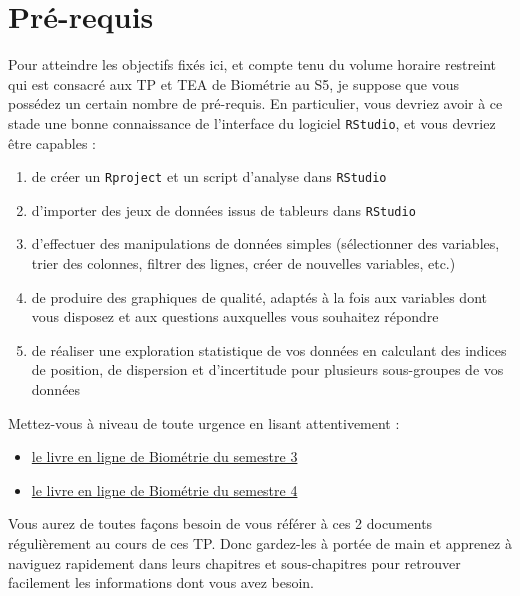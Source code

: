 \documentclass[
  french,
  a4paper,
  DIV=11,
  numbers=noendperiod,
  oneside]{scrreprt}
\providecommand{\tightlist}{%
  \setlength{\itemsep}{0pt}\setlength{\parskip}{0pt}}
\begin{document}
\section*{Pré-requis}\label{pruxe9-requis}


Pour atteindre les objectifs fixés ici, et compte tenu du volume horaire
restreint qui est consacré aux TP et TEA de Biométrie au S5, je suppose
que vous possédez un certain nombre de pré-requis. En particulier, vous
devriez avoir à ce stade une bonne connaissance de l'interface du
logiciel \texttt{RStudio}, et vous devriez être capables :

\begin{enumerate}
\def\labelenumi{\arabic{enumi}.}
\tightlist
\item
  de créer un \texttt{Rproject} et un script d'analyse dans
  \texttt{RStudio}
\item
  d'importer des jeux de données issus de tableurs dans \texttt{RStudio}
\item
  d'effectuer des manipulations de données simples (sélectionner des
  variables, trier des colonnes, filtrer des lignes, créer de nouvelles
  variables, etc.)
\item
  de produire des graphiques de qualité, adaptés à la fois aux variables
  dont vous disposez et aux questions auxquelles vous souhaitez répondre
\item
  de réaliser une exploration statistique de vos données en calculant
  des indices de position, de dispersion et d'incertitude pour plusieurs
  sous-groupes de vos données
\end{enumerate}

\begin{tcolorbox}[enhanced jigsaw, arc=.35mm, bottomrule=.15mm, bottomtitle=1mm, breakable, colback=white, colbacktitle=quarto-callout-warning-color!10!white, colframe=quarto-callout-warning-color-frame, coltitle=black, left=2mm, leftrule=.75mm, opacityback=0, opacitybacktitle=0.6, rightrule=.15mm, title=\textcolor{quarto-callout-warning-color}{\faExclamationTriangle}\hspace{0.5em}{Si ces pré-requis ne sont pas maîtrisés}, titlerule=0mm, toprule=.15mm, toptitle=1mm]

Mettez-vous à niveau de toute urgence en lisant attentivement :

\begin{itemize}
\tightlist
\item
  \href{https://besibo.github.io/BiometrieS3/}{le livre en ligne de
  Biométrie du semestre 3}
\item
  \href{https://besibo.github.io/BiometrieS4/}{le livre en ligne de
  Biométrie du semestre 4}
\end{itemize}

Vous aurez de toutes façons besoin de vous référer à ces 2 documents
régulièrement au cours de ces TP. Donc gardez-les à portée de main et
apprenez à naviguez rapidement dans leurs chapitres et sous-chapitres
pour retrouver facilement les informations dont vous avez besoin.

\end{tcolorbox}
\end{document}

